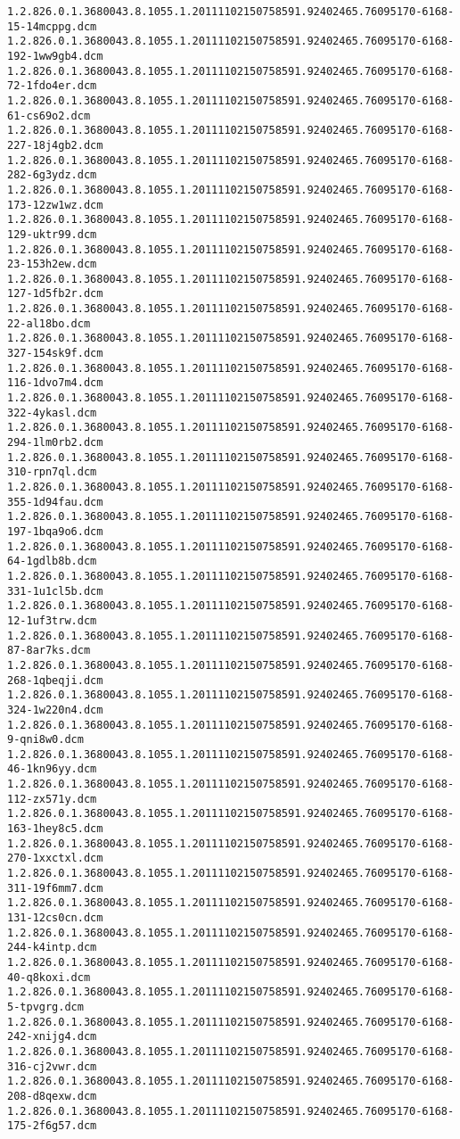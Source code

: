 \begin{lstlisting}
1.2.826.0.1.3680043.8.1055.1.20111102150758591.92402465.76095170-6168-15-14mcppg.dcm 1.2.826.0.1.3680043.8.1055.1.20111102150758591.92402465.76095170-6168-192-1ww9gb4.dcm 1.2.826.0.1.3680043.8.1055.1.20111102150758591.92402465.76095170-6168-72-1fdo4er.dcm 1.2.826.0.1.3680043.8.1055.1.20111102150758591.92402465.76095170-6168-61-cs69o2.dcm 1.2.826.0.1.3680043.8.1055.1.20111102150758591.92402465.76095170-6168-227-18j4gb2.dcm 1.2.826.0.1.3680043.8.1055.1.20111102150758591.92402465.76095170-6168-282-6g3ydz.dcm 1.2.826.0.1.3680043.8.1055.1.20111102150758591.92402465.76095170-6168-173-12zw1wz.dcm 1.2.826.0.1.3680043.8.1055.1.20111102150758591.92402465.76095170-6168-129-uktr99.dcm 1.2.826.0.1.3680043.8.1055.1.20111102150758591.92402465.76095170-6168-23-153h2ew.dcm 1.2.826.0.1.3680043.8.1055.1.20111102150758591.92402465.76095170-6168-127-1d5fb2r.dcm 1.2.826.0.1.3680043.8.1055.1.20111102150758591.92402465.76095170-6168-22-al18bo.dcm 1.2.826.0.1.3680043.8.1055.1.20111102150758591.92402465.76095170-6168-327-154sk9f.dcm 1.2.826.0.1.3680043.8.1055.1.20111102150758591.92402465.76095170-6168-116-1dvo7m4.dcm 1.2.826.0.1.3680043.8.1055.1.20111102150758591.92402465.76095170-6168-322-4ykasl.dcm 1.2.826.0.1.3680043.8.1055.1.20111102150758591.92402465.76095170-6168-294-1lm0rb2.dcm 1.2.826.0.1.3680043.8.1055.1.20111102150758591.92402465.76095170-6168-310-rpn7ql.dcm 1.2.826.0.1.3680043.8.1055.1.20111102150758591.92402465.76095170-6168-355-1d94fau.dcm 1.2.826.0.1.3680043.8.1055.1.20111102150758591.92402465.76095170-6168-197-1bqa9o6.dcm 1.2.826.0.1.3680043.8.1055.1.20111102150758591.92402465.76095170-6168-64-1gdlb8b.dcm 1.2.826.0.1.3680043.8.1055.1.20111102150758591.92402465.76095170-6168-331-1u1cl5b.dcm 1.2.826.0.1.3680043.8.1055.1.20111102150758591.92402465.76095170-6168-12-1uf3trw.dcm 1.2.826.0.1.3680043.8.1055.1.20111102150758591.92402465.76095170-6168-87-8ar7ks.dcm 1.2.826.0.1.3680043.8.1055.1.20111102150758591.92402465.76095170-6168-268-1qbeqji.dcm 1.2.826.0.1.3680043.8.1055.1.20111102150758591.92402465.76095170-6168-324-1w220n4.dcm 1.2.826.0.1.3680043.8.1055.1.20111102150758591.92402465.76095170-6168-9-qni8w0.dcm 1.2.826.0.1.3680043.8.1055.1.20111102150758591.92402465.76095170-6168-46-1kn96yy.dcm 1.2.826.0.1.3680043.8.1055.1.20111102150758591.92402465.76095170-6168-112-zx571y.dcm 1.2.826.0.1.3680043.8.1055.1.20111102150758591.92402465.76095170-6168-163-1hey8c5.dcm 1.2.826.0.1.3680043.8.1055.1.20111102150758591.92402465.76095170-6168-270-1xxctxl.dcm 1.2.826.0.1.3680043.8.1055.1.20111102150758591.92402465.76095170-6168-311-19f6mm7.dcm 1.2.826.0.1.3680043.8.1055.1.20111102150758591.92402465.76095170-6168-131-12cs0cn.dcm 1.2.826.0.1.3680043.8.1055.1.20111102150758591.92402465.76095170-6168-244-k4intp.dcm 1.2.826.0.1.3680043.8.1055.1.20111102150758591.92402465.76095170-6168-40-q8koxi.dcm 1.2.826.0.1.3680043.8.1055.1.20111102150758591.92402465.76095170-6168-5-tpvgrg.dcm 1.2.826.0.1.3680043.8.1055.1.20111102150758591.92402465.76095170-6168-242-xnijg4.dcm 1.2.826.0.1.3680043.8.1055.1.20111102150758591.92402465.76095170-6168-316-cj2vwr.dcm 1.2.826.0.1.3680043.8.1055.1.20111102150758591.92402465.76095170-6168-208-d8qexw.dcm 1.2.826.0.1.3680043.8.1055.1.20111102150758591.92402465.76095170-6168-175-2f6g57.dcm 
\end{lstlisting}
